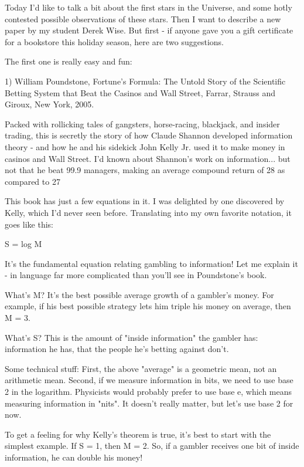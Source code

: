 

Today I'd like to talk a bit about the first stars in the Universe,
and some hotly contested possible observations of these stars.  Then I
want to describe a new paper by my student Derek Wise.  But first - if
anyone gave you a gift certificate for a bookstore this holiday
season, here are two suggestions.

The first one is really easy and fun:

1) William Poundstone, Fortune's Formula: The Untold Story of the 
Scientific Betting System that Beat the Casinos and Wall Street, 
Farrar, Strauss and Giroux, New York, 2005.

Packed with rollicking tales of gangsters, horse-racing, blackjack, 
and insider 
trading, this is secretly the story of how Claude Shannon developed
information theory - and how he and his sidekick John Kelly Jr. used 
it to make money in casinos and Wall Street.  I'd known about Shannon's 
work on information... but not that he beat 99.9%
managers, making an average compound return of 28%
as compared to 27%

This book has just a few equations in it.  I was delighted by one 
discovered by Kelly, which I'd never seen before.  Translating into my
own favorite notation, it goes like this:

S = log M

It's the fundamental equation relating gambling to information!
Let me explain it - in language far more complicated than you'll 
see in Poundstone's book.

What's M?  It's the best possible average growth of a gambler's money.  
For example, if his best possible strategy lets him triple his money 
on average, then M = 3.  

What's S?  This is the amount of "inside information" the
gambler has: information he has, that the people he's betting against
don't.

Some technical stuff: First, the above "average" is a
geometric mean, not an arithmetic mean.  Second, if we measure
information in bits, we need to use base 2 in the logarithm.
Physicists would probably prefer to use base e, which means measuring
information in "nits".  It doesn't really matter, but let's
use base 2 for now.

To get a feeling for why Kelly's theorem is true, it's best to start 
with the simplest example.  If S = 1, then M = 2. So, if a gambler 
receives one bit of inside information, he can double his money!

